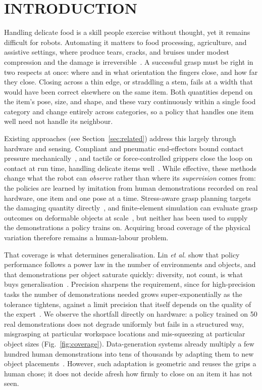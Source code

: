 \section{INTRODUCTION}

Handling delicate food is a skill people exercise without thought, yet it remains difficult for
robots. Automating it matters to food processing, agriculture, and assistive settings, where
produce tears, cracks, and bruises under modest compression and the damage is
irreversible~\cite{zhu2025deformable,blanco2024t,wang2025damageless}. A successful grasp must be
right in two respects at once: where and in what orientation the fingers close, and how far they
close. Closing across a thin edge, or straddling a stem, fails at a width that would have been
correct elsewhere on the same item. Both quantities depend on the item's pose, size, and shape,
and these vary continuously within a single food category and change entirely across categories,
so a policy that handles one item well need not handle its neighbour.

Existing approaches (see Section~\ref{sec:related}) address this largely through hardware and
sensing. Compliant and pneumatic end-effectors bound contact pressure
mechanically~\cite{wang2024softgripper}, and tactile or force-controlled grippers close the loop
on contact at run time, handling delicate items well~\cite{kang2026learning,vtam}. While
effective, these methods change what the robot can \emph{observe} rather than where its
\emph{supervision} comes from: the policies are learned by imitation from human demonstrations
recorded on real hardware, one item and one pose at a time. Stress-aware grasp planning targets
the damaging quantity directly~\cite{pan2020stressmin}, and finite-element simulation can
evaluate grasp outcomes on deformable objects at scale~\cite{defgraspsim}, but neither has been
used to supply the demonstrations a policy trains on. Acquiring broad coverage of the physical
variation therefore remains a human-labour problem.

That coverage is what determines generalisation. Lin \emph{et al.} show that policy performance
follows a power law in the number of environments and objects, and that demonstrations per
object saturate quickly: diversity, not count, is what buys
generalisation~\cite{lin2025datascaling}. Precision sharpens the requirement, since for
high-precision tasks the number of demonstrations needed grows super-exponentially as the
tolerance tightens, against a limit precision that itself depends on the quality of the
expert~\cite{curseofprecision}. We observe the shortfall directly on hardware: a policy trained
on 50 real demonstrations does not degrade uniformly but fails in a structured way, misgrasping
at particular workspace locations and mis-squeezing at particular object sizes
(Fig.~\ref{fig:coverage}). Data-generation systems already multiply a few hundred human
demonstrations into tens of thousands by adapting them to new object
placements~\cite{mandlekar2023mimicgen}. However, such adaptation is geometric and reuses the
grips a human chose; it does not decide afresh how firmly to close on an item it has not seen.

